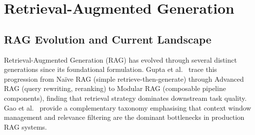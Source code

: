 \begin{table}[htbp]
\centering
\caption{Comparison of recent automated occupation coding systems.}
\label{tab:ch2-coding}
\footnotesize\renewcommand{\arraystretch}{1.3}
\end{table}

\section{Retrieval-Augmented Generation}
\label{sec:rw-rag}

\subsection{RAG Evolution and Current Landscape}

Retrieval-Augmented Generation (RAG) has evolved through several distinct
generations since its foundational formulation.
Gupta et al.~\cite{gupta2024ragevo} trace this progression from Na\"{i}ve RAG
(simple retrieve-then-generate) through Advanced RAG (query rewriting, reranking)
to Modular RAG (composable pipeline components), finding that retrieval strategy
dominates downstream task quality.
Gao et al.~\cite{gao2024ragsurvey} provide a complementary taxonomy emphasising
that context window management and relevance filtering are the dominant bottlenecks
in production RAG systems.


